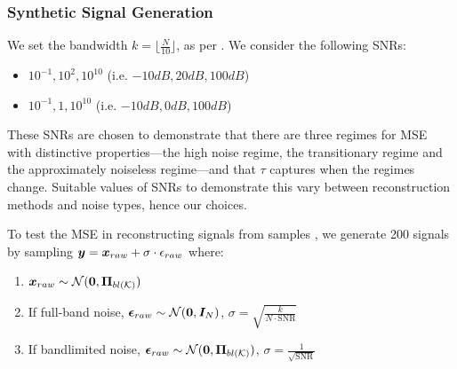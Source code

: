 \subsubsection{Synthetic Signal Generation}
We set the bandwidth  $k = \lfloor \frac{N}{10} \rfloor$, as per \cite{bai2020fast}.  We consider the following SNRs:

\begin{itemize}
    \item{  $10^{-1}, 10^{2}, 10^{10}$ (i.e. $-10dB, 20dB, 100dB$)}
    \item{  $10^{-1}, 1, 10^{10}$ (i.e. $-10dB, 0dB, 100dB$)}
\end{itemize}
These SNRs are chosen to demonstrate that there are three regimes for MSE with distinctive properties---the high noise regime, the transitionary regime and the approximately noiseless regime---and that $\tau$ captures when the regimes change. Suitable values of SNRs to demonstrate this vary between reconstruction methods and noise types, hence our choices.

To test the MSE in reconstructing signals from samples , we generate 200 signals by sampling $\bm{y} = \bm{x}_{raw} + \sigma \cdot \epsilon_{raw}$ where:
\begin{enumerate}
    \item $\bm{x}_{raw} \sim \mathcal{N}(\bm{0}, \bm{\Pi}_{bl(\mathcal{K})})$ 
    \item[2a)] If full-band noise, $\bm{\epsilon}_{raw} \sim \mathcal{N}(\bm{0}, \bm{I}_{N})$, $\sigma = \sqrt{\frac{k}{{N \cdot\text{SNR}}}}$
    \item[2b)]  If bandlimited noise, $\vect{\epsilon}_{raw} \sim \mathcal{N}(\vect{0}, \projbl )$, $\sigma = \frac{1}{\sqrt{\text{SNR}}}$ 
\end{enumerate}

